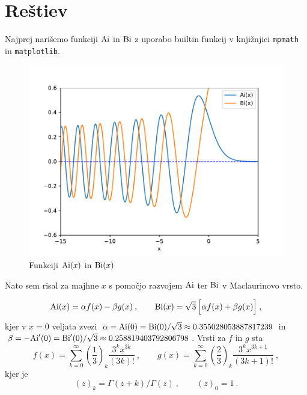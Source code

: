 \section{Reštiev}
Najprej narišemo funkciji $\mathrm{Ai}$ in $\mathrm{Bi}$ z uporabo builtin funkcij v
knjižnjici \verb|mpmath| in \verb|matplotlib|.

\begin{figure}[h]
    \begin{center}
        \includegraphics[width=13cm]{sections/poglavje1/pdfs/True_airy.pdf}
        \caption{Funkciji $\mathrm{Ai}(x)$ in $\mathrm{Bi}(x)$}
        \label{slika 1}
    \end{center}
\end{figure}

Nato sem risal za majhne $x$ s pomočjo razvojem $\mathrm{Ai}$ ter $\mathrm{Bi}$
v Maclaurinovo vrsto.

\begin{equation}
    \mathrm{Ai}(x) = \alpha f(x) - \beta g(x)\>,\qquad
    \mathrm{Bi}(x) = \sqrt{3}\, \Bigl[\alpha f (x) + \beta g(x) \Bigr]\>,
\end{equation}
kjer v $x=0$ veljata zvezi
%
$\alpha = \mathrm{Ai}(0) = \mathrm{Bi}(0)/\sqrt{3}\approx 0.355028053887817239$ in
$\beta = -\mathrm{Ai}'(0) = \mathrm{Bi}'(0)/\sqrt{3}\approx 0.258819403792806798$.
Vrsti za $f$ in $g$ sta
\begin{equation}
  f(x) = \sum_{k=0}^\infty
  \left(\frac{1}{3}\right)_k \frac{3^k x^{3k}}{(3k)!} \>, \qquad
  g(x) = \sum_{k=0}^\infty
  \left(\frac{2}{3}\right)_k \frac{3^k x^{3k+1}}{(3k+1)!} \>,\label{2}
\end{equation}
kjer je
\begin{equation}
  (z)_k = \Gamma(z+k)/\Gamma(z) \>, \qquad (z)_0 = 1 \>.\label{3}
\end{equation}

